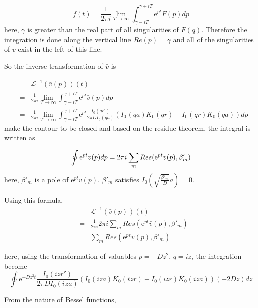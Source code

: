 \documentclass{article}
\begin{document}
\begin{equation}
    f(t) = \frac{1}{2\pi i} \lim_{T \to \infty} 
           \int^{\gamma + iT}_{\gamma - iT} \mathrm{e}^{pt}F(p)dp
\end{equation}
here, $\gamma$ is greater than the real part of all singularities of $F(q)$.
Therefore the integration is done along the vertical line $Re(p) = \gamma$
and all of the singularities of $\bar{v}$ exist in the left of this line.

So the inverse transformation of $\bar{v}$ is

\begin{eqnarray}
    & & \mathscr{L}^{-1} \left(\bar{v}(p)\right)(t) \nonumber \\
    &=& \frac{1}{2\pi i} \lim_{T \to \infty}
        \int^{\gamma + iT}_{\gamma - iT} \mathrm{e}^{pt} \bar{v}(p) dp \nonumber \\
    &=& \frac{1}{2\pi i} \lim_{T \to \infty} \int^{\gamma + iT}_{\gamma - iT}
        \mathrm{e}^{pt} \frac{I_0(qr')}{2\pi DI_0(qa)}
        \left(I_0(qa)K_0(qr) - I_0(qr)K_0(qa) \right) dp
\end{eqnarray}
make the contour to be closed and 
based on the residue-theorem, the integral is written as

\begin{equation}
    \oint \mathrm{e}^{pt} \bar{v}(p) dp \nonumber \\
    = 2\pi i\sum_m Res(\mathrm{e}^{pt} \bar{v}(p), \beta'_m)
\end{equation}
here, $\beta'_m$ is a pole of $\mathrm{e}^{pt} \bar{v}(p)$.
$\beta'_m$ satisfies $I_0\left(\sqrt{\frac{\beta'_m}{D}} a\right) = 0$.

Using this formula,
\begin{eqnarray}
    & & \mathscr{L}^{-1} \left(\bar{v}(p)\right)(t) \nonumber \\
    &=& \frac{1}{2\pi i} 2\pi i
        \sum_m Res(\mathrm{e}^{pt} \bar{v}(p), \beta'_m) \nonumber \\
    &=& \sum_m Res(\mathrm{e}^{pt} \bar{v}(p), \beta'_m)
\end{eqnarray}

here, using the transformation of valuables $p = -Dz^2$, $q = iz$, the integration become
\begin{equation}
    \oint \mathrm{e}^{-Dz^2t} \frac{I_0(izr')}{2\pi DI_0(iza)}
    \left(I_0(iza)K_0(izr) - I_0(izr)K_0(iza) \right) (-2Dz)dz
\end{equation}

From the nature of Bessel functions,
\end{document}
